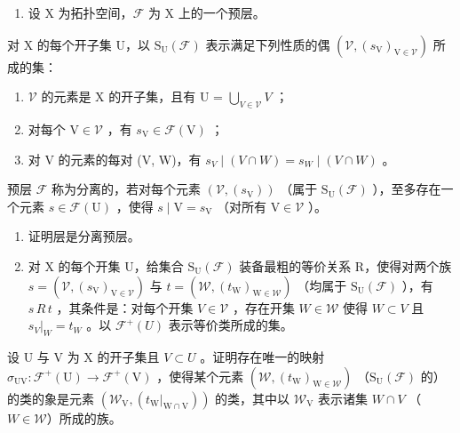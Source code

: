 \begin{enumerate}
\def\labelenumi{\arabic{enumi})}
\setcounter{enumi}{3}
\tightlist
\item
  设 X 为拓扑空间，\(\mathcal{F}\) 为 X 上的一个预层。
\end{enumerate}

对 X 的每个开子集 U，以 \(\mathrm{S}_{\mathrm{U}}(\mathcal{F})\) 表示满足下列性质的偶 \((\mathcal{V}, (s_{\mathrm{V}})_{\mathrm{V} \in \mathcal{V}})\) 所成的集：

\begin{enumerate}
\def\labelenumi{(\roman{enumi})}
\item
  \(\mathcal{V}\) 的元素是 X 的开子集，且有 U = \(\bigcup_{V\in\mathcal{V}}V\) ；
\item
  对每个 \(\mathrm{V} \in \mathcal{V}\) ，有 \(s_{\mathrm{V}} \in \mathcal{F}(\mathrm{V})\) ；
\item
  对 V 的元素的每对 (V, W)，有 \(s_{V} \mid (V \cap W) = s_{W} \mid (V \cap W)\) 。
\end{enumerate}

预层 \(\mathcal{F}\) 称为分离的，若对每个元素 \((\mathcal{V},(s_{\mathrm{V}}))\) （属于 \(\mathrm{S_U}(\mathcal{F})\) ），至多存在一个元素 \(s\in \mathcal{F}(\mathrm{U})\) ，使得 \(s\mid \mathrm{V} = s_{\mathrm{V}}\) （对所有 \(\mathrm{V}\in \mathcal{V}\) ）。

\begin{enumerate}
\def\labelenumi{\alph{enumi})}
\item
  证明层是分离预层。
\item
  对 X 的每个开集 U，给集合 \(\mathrm{S}_{\mathrm{U}}(\mathcal{F})\) 装备最粗的等价关系 R，使得对两个族 \(s = (\mathcal{V}, (s_{\mathrm{V}})_{\mathrm{V} \in \mathcal{V}})\) 与 \(t = (\mathcal{W}, (t_{\mathrm{W}})_{\mathrm{W} \in \mathcal{W}})\) （均属于 \(\mathrm{S}_{\mathrm{U}}(\mathcal{F})\) ），有 \(s\,R\,t\) ，其条件是：对每个开集 \(V \in \mathcal{V}\) ，存在开集 \(W \in \mathcal{W}\) 使得 \(W \subset V\) 且 \(s_{V}|_{W} = t_{W}\) 。以 \(\mathcal{F}^{+}(U)\) 表示等价类所成的集。
\end{enumerate}

设 U 与 V 为 X 的开子集且 \(V \subset U\) 。证明存在唯一的映射 \(\sigma_{\mathrm{UV}}: \mathcal{F}^{+}(\mathrm{U}) \to \mathcal{F}^{+}(\mathrm{V})\) ，使得某个元素 \((\mathcal{W}, (t_{\mathrm{W}})_{\mathrm{W} \in \mathcal{W}})\) （\(\mathrm{S}_{\mathrm{U}}(\mathcal{F})\) 的）的类的象是元素 \((\mathcal{W}_{\mathrm{V}}, (t_{\mathrm{W}}|_{\mathrm{W} \cap \mathrm{V}}))\) 的类，其中以 \(\mathcal{W}_{\mathrm{V}}\) 表示诸集 \(W \cap V\) （\(W \in \mathcal{W}\)）所成的族。

